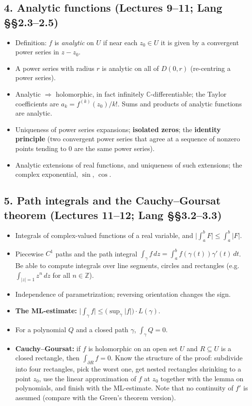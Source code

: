 \documentclass[12pt, reqno]{amsart}
\theoremstyle{definition}
\numberwithin{equation}{subsection}
\newcommand{\C}{\mathbb{C}}
\newcommand{\zee}{\mathbb{Z}}
\begin{document}
\subsection*{4. Analytic functions \normalfont (Lectures 9--11; Lang \S\S2.3--2.5)}
\begin{itemize}[leftmargin=*]
\item Definition: $f$ is \emph{analytic} on $U$ if near each $z_0\in U$ it is given by a convergent power series in $z-z_0$.
\item A power series with radius $r$ is analytic on all of $D(0,r)$ (re-centring a power series).
\item Analytic $\Rightarrow$ holomorphic, in fact infinitely $\C$-differentiable; the Taylor coefficients are
      $a_k=f^{(k)}(z_0)/k!$. Sums and products of analytic functions are analytic.
\item Uniqueness of power series expansions; \textbf{isolated zeros}; the \textbf{identity principle}
      (two convergent power series that agree at a sequence of nonzero points tending to $0$ are the same power series).
\item Analytic extensions of real functions, and uniqueness of such extensions; the complex exponential, $\sin$, $\cos$.
\end{itemize}

\subsection*{5. Path integrals and the Cauchy--Goursat theorem \normalfont (Lectures 11--12; Lang \S\S3.2--3.3)}
\begin{itemize}[leftmargin=*]
\item Integrals of complex-valued functions of a real variable, and $\bigl|\int_a^bF\bigr|\le\int_a^b|F|$.
\item Piecewise $C^1$ paths and the path integral $\int_\gamma f\,dz=\int_a^b f(\gamma(t))\gamma'(t)\,dt$.
      Be able to compute integrals over line segments, circles and rectangles
      (e.g.\ $\int_{|z|=1}z^n\,dz$ for all $n\in\zee$).
\item Independence of parametrization; reversing orientation changes the sign.
\item \textbf{The ML-estimate:} $\bigl|\int_\gamma f\bigr|\le\bigl(\sup_{\gamma}|f|\bigr)\cdot L(\gamma)$.
\item For a polynomial $Q$ and a closed path $\gamma$, $\int_\gamma Q=0$.
\item \textbf{Cauchy--Goursat:} if $f$ is holomorphic on an open set $U$ and $R\subseteq U$ is a closed rectangle, then
      $\int_{\partial R}f=0$. Know the structure of the proof: subdivide into four rectangles,
      pick the worst one, get nested rectangles shrinking to a point $z_0$, use the linear approximation of $f$ at $z_0$
      together with the lemma on polynomials, and finish with the ML-estimate.
      Note that no continuity of $f'$ is assumed (compare with the Green's theorem version).
\end{itemize}
\end{document}
